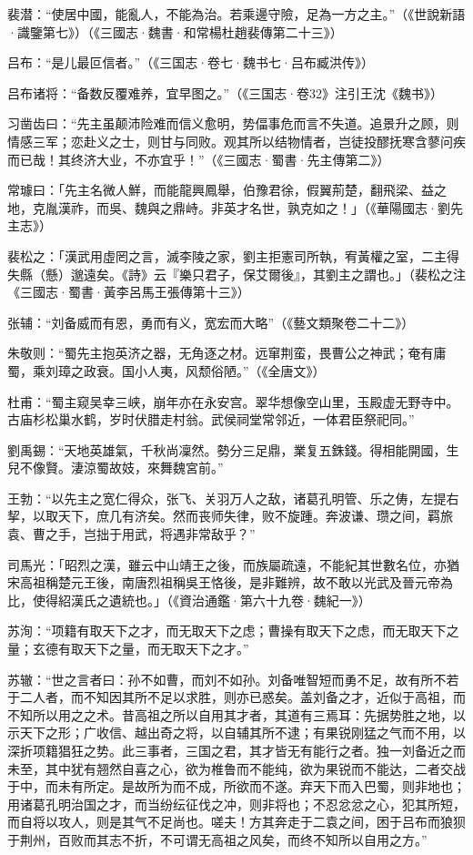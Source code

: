 裴潜：“使居中國，能亂人，不能為治。若乘邊守險，足為一方之主。”（《世說新語·識鑒第七》）（《三國志·魏書·和常楊杜趙裴傳第二十三》）

吕布：“是儿最叵信者。”（《三国志·卷七·魏书七·吕布臧洪传》）

吕布诸将：“备数反覆难养，宜早图之。”（《三国志·卷32》注引王沈《魏书》）

习凿齿曰：“先主虽颠沛险难而信义愈明，势偪事危而言不失道。追景升之顾，则情感三军；恋赴义之士，则甘与同败。观其所以结物情者，岂徒投醪抚寒含蓼问疾而已哉！其终济大业，不亦宜乎！”（《三國志·蜀書·先主傳第二》）

常璩曰：「先主名微人鮮，而能龍興鳳舉，伯豫君徐，假翼荊楚，翻飛梁、益之地，克胤漢祚，而吳、魏與之鼎峙。非英才名世，孰克如之！」（《華陽國志·劉先主志》）

裴松之：「漢武用虛罔之言，滅李陵之家，劉主拒憲司所執，宥黃權之室，二主得失縣（懸）邈遠矣。《詩》云『樂只君子，保艾爾後』，其劉主之謂也。」（裴松之注《三國志·蜀書·黃李呂馬王張傳第十三》）

张辅：“刘备威而有恩，勇而有义，宽宏而大略”（《藝文類聚卷二十二》）

朱敬则：“蜀先主抱英济之器，无角逐之材。远窜荆蛮，畏曹公之神武；奄有庸蜀，乘刘璋之政衰。国小人夷，风颓俗陋。”（《全唐文》）

杜甫：“蜀主窥吴幸三峡，崩年亦在永安宫。翠华想像空山里，玉殿虚无野寺中。古庙杉松巢水鹤，岁时伏腊走村翁。武侯祠堂常邻近，一体君臣祭祀同。”

劉禹錫：“天地英雄氣，千秋尚凜然。勢分三足鼎，業复五銖錢。得相能開國，生兒不像賢。淒涼蜀故妓，來舞魏宮前。”

王勃：“以先主之宽仁得众，张飞、关羽万人之敌，诸葛孔明管、乐之俦，左提右挈，以取天下，庶几有济矣。然而丧师失律，败不旋踵。奔波谦、瓒之间，羁旅袁、曹之手，岂拙于用武，将遇非常敌乎？”

司馬光：「昭烈之漢，雖云中山靖王之後，而族屬疏遠，不能紀其世數名位，亦猶宋高祖稱楚元王後，南唐烈祖稱吳王恪後，是非難辨，故不敢以光武及晉元帝為比，使得紹漢氏之遺統也。」（《資治通鑑·第六十九卷·魏紀一》）

苏洵：“项籍有取天下之才，而无取天下之虑；曹操有取天下之虑，而无取天下之量；玄德有取天下之量，而无取天下之才。”

苏辙：“世之言者曰：孙不如曹，而刘不如孙。刘备唯智短而勇不足，故有所不若于二人者，而不知因其所不足以求胜，则亦已惑矣。盖刘备之才，近似于高祖，而不知所以用之之术。昔高祖之所以自用其才者，其道有三焉耳：先据势胜之地，以示天下之形；广收信、越出奇之将，以自辅其所不逮；有果锐刚猛之气而不用，以深折项籍猖狂之势。此三事者，三国之君，其才皆无有能行之者。独一刘备近之而未至，其中犹有翘然自喜之心，欲为椎鲁而不能纯，欲为果锐而不能达，二者交战于中，而未有所定。是故所为而不成，所欲而不遂。弃天下而入巴蜀，则非地也；用诸葛孔明治国之才，而当纷纭征伐之冲，则非将也；不忍忿忿之心，犯其所短，而自将以攻人，则是其气不足尚也。嗟夫！方其奔走于二袁之间，困于吕布而狼狈于荆州，百败而其志不折，不可谓无高祖之风矣，而终不知所以自用之方。”

